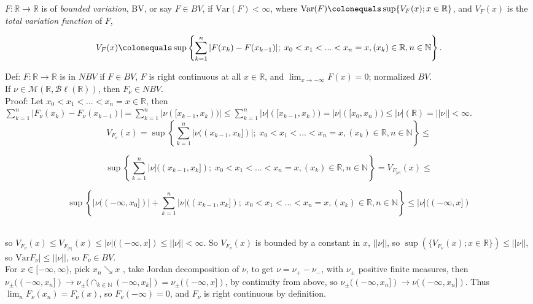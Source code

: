 \documentclass[12pt]{article}
\newcommand{\nats}[0] { \mathbb{N}}
\newcommand{\reals}[0] { \mathbb{R}}
\newcommand{\M}[0] { \mathcal{M} }
\newcommand{\Bl}[0] { \mathcal{B} \ell }
\newcommand{\rarw}[0] { \rightarrow }
\newcommand{ \defeq }[0] { \colonequals }
\newcommand{ \Var } { \textrm{Var} }
\begin{document}
$F: \reals \rarw \reals$ is of \emph{bounded variation}, BV, or say $F \in BV$, if $\Var(F) < \infty$, where $\Var(F) \defeq \sup\{ V_F(x); x \in \reals \}$, and $V_F(x)$ is the \emph{total variation function} of $F$,

$$
V_F(x) \defeq \sup \left\{  \sum_{k=1}^n |F(x_k) - F(x_{k-1})| ; \;  x_0    < x_1 < ... < x_n=x, ( x_k ) \in \reals, n \in \nats \right\}.
$$

Def: $F: \reals \rarw \reals$ is in $NBV$ if $F \in BV$, $F$ is right continuous at all $x \in \reals$, and $\lim_{x \rarw -\infty} F(x) = 0$; normalized $BV$.\\

If $\nu \in \M(\reals, \Bl(\reals))$, then $F_\nu \in NBV$. \\

\noindent
Proof: Let $x_0 < x_1 < ... < x_n = x \in \reals$, then $\sum_{k=1}^n |F_\nu(x_k) - F_\nu(x_{k-1})| = \sum_{k=1}^n |\nu([x_{k-1}, x_{k}))| \le \sum_{k=1}^n |\nu|([x_{k-1}, x_{k})) = |\nu|([x_0,x_n)) \le |\nu|(\reals) = ||\nu|| < \infty$. \\




$$
V_{F_\nu}(x) = \sup \left\{  \sum_{k=1}^n | \nu(( x_{k-1},x_k ]) | ; \;  x_0    < x_1 < ... < x_n=x, ( x_k ) \in \reals, n \in \nats \right\} \le 
$$

$$
\sup \left\{  \sum_{k=1}^n |\nu|(( x_{k-1},x_k ]) ; \;  x_0    < x_1 < ... < x_n=x, ( x_k ) \in \reals, n \in \nats \right\}  = V_{F_{|\nu|}}(x)  \le 
$$

$$ \sup \left\{  |\nu((-\infty,x_0])| + \sum_{k=1}^n | \nu | (( x_{k-1},x_k ]); \;  x_0    < x_1 < ... < x_n=x, ( x_k ) \in \reals, n \in \nats \right\} \le |\nu|((-\infty,x])
$$  \\


\noindent

so $ V_{F_\nu}(x) \le V_{F_{|\nu|}}(x)  \le  |\nu|((-\infty,x]) \le ||\nu|| < \infty$. So $V_{F_\nu}(x)$ is bounded by a constant in $x$, $||\nu||$, so $\sup(\{ V_{F_\nu}(x); x \in \reals \}) \le ||\nu||$, so $\Var{F_\nu|} \le ||\nu||$, so $F_\nu \in BV$.   \\

For $x \in [-\infty,\infty)$, pick $x_n \searrow x$ , take Jordan decomposition of $\nu$, to get $\nu = \nu_+ - \nu_-$, with $\nu_\pm$ positive finite measures, then $\nu_\pm((-\infty,x_n]) \rarw \nu_\pm(\cap_{k \in \nats} (-\infty,x_k]) = \nu_\pm((-\infty,x]) $, by continuity from above, so $\nu_\pm((-\infty,x_n]) \rarw \nu((-\infty,x_n])$. Thus $\lim_n F_\nu(x_n) = F_\nu(x)$, so $F_\nu(-\infty) = 0$, and $F_\nu$ is right continuous by definition.  \\
\end{document}
